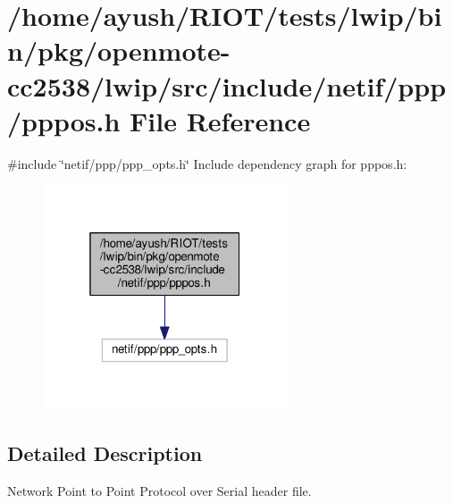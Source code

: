 \hypertarget{openmote-cc2538_2lwip_2src_2include_2netif_2ppp_2pppos_8h}{}\section{/home/ayush/\+R\+I\+O\+T/tests/lwip/bin/pkg/openmote-\/cc2538/lwip/src/include/netif/ppp/pppos.h File Reference}
\label{openmote-cc2538_2lwip_2src_2include_2netif_2ppp_2pppos_8h}
{\ttfamily \#include \char`\"{}netif/ppp/ppp\+\_\+opts.\+h\char`\"{}}\newline
Include dependency graph for pppos.\+h\+:
\nopagebreak
\begin{figure}[H]
\begin{center}
\leavevmode
\includegraphics[width=205pt]{openmote-cc2538_2lwip_2src_2include_2netif_2ppp_2pppos_8h__incl}
\end{center}
\end{figure}


\subsection{Detailed Description}
Network Point to Point Protocol over Serial header file. 